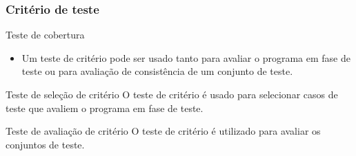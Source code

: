 \begin{frame}[hasprev=true, hasnext=false]
\frametitle{Critério de teste}

\begin{block:fact}{Teste de cobertura}
\begin{itemize}
	\item Um teste de critério pode ser usado tanto para avaliar o programa em fase de teste ou para avaliação de consistência de um conjunto de teste.
\end{itemize}
\end{block:fact}

\begin{block:concept}{Teste de seleção de critério}
O teste de critério é usado para selecionar casos de teste que avaliem o programa em fase de teste.
\end{block:concept}


\begin{block:concept}{Teste de avaliação de critério}
O teste de critério é utilizado para avaliar os conjuntos de teste.
\end{block:concept}
\end{frame}



